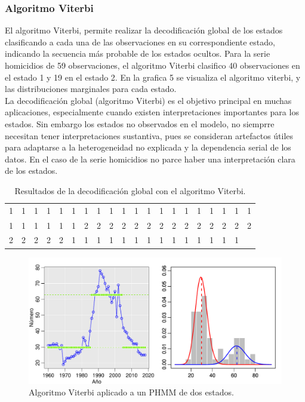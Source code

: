 \documentclass[a4paper]{article}\usepackage[]{graphicx}\usepackage[]{color}
\makeatletter
\def\maxwidth{ %
  \ifdim\Gin@nat@width>\linewidth
    \linewidth
  \else
    \Gin@nat@width
  \fi
}
\newenvironment{knitrout}{}{} %
\makeatother
\begin{document}
\subsubsection*{Algoritmo Viterbi}

El algoritmo Viterbi, permite realizar la decodificación global de los estados clasificando a cada una de las observaciones en su correspondiente estado, indicando la secuencia más probable de los estados ocultos. Para la serie homicidios de 59 observaciones, el algoritmo Viterbi clasifico 40 observaciones en el estado 1 y 19 en el estado 2. En la grafica 5 se visualiza el algoritmo viterbi, y las distribuciones marginales para cada estado.
\\
La decodificación global (algoritmo Viterbi) es el objetivo principal en muchas aplicaciones, especialmente cuando existen interpretaciones importantes para los estados. Sin embargo los estados no observados en el modelo, no siemprre necesitan tener interpretaciones sustantiva, pues se consideran artefactos útiles para adaptarse a la heterogeneidad no explicada y la dependencia serial de los datos. En el caso de la serie homicidios no parce haber una interpretación clara de los estados.

\begin{table}[ht]
\centering
\begin{tabular}{rrrrrrrrrrrrrrrrrrrr}
  \hline
  \hline
1 & 1 & 1 & 1 & 1 & 1 & 1 & 1 & 1 & 1 & 1 & 1 & 1 & 1 & 1 & 1 & 1 & 1 & 1 & 1 \\ 
  1 & 1 & 1 & 1 & 1 & 1 & 2 & 2 & 2 & 2 & 2 & 2 & 2 & 2 & 2 & 2 & 2 & 2 & 2 & 2 \\ 
  2 & 2 & 2 & 2 & 2 & 1 & 1 & 1 & 1 & 1 & 1 & 1 & 1 & 1 & 1 & 1 & 1 & 1 & 1 &  \\ 
   \hline
\end{tabular}
\caption{Resultados de la decodificación global con el algoritmo Viterbi.} 
\end{table}


\begin{knitrout}
\color{fgcolor}\begin{figure}
\includegraphics[width=\maxwidth]{figure/unnamed-chunk-18-1} \caption[Algoritmo Viterbi aplicado a un PHMM de dos estados]{Algoritmo Viterbi aplicado a un PHMM de dos estados.}\label{fig:unnamed-chunk-18}
\end{figure}


\end{knitrout}
\end{document}
